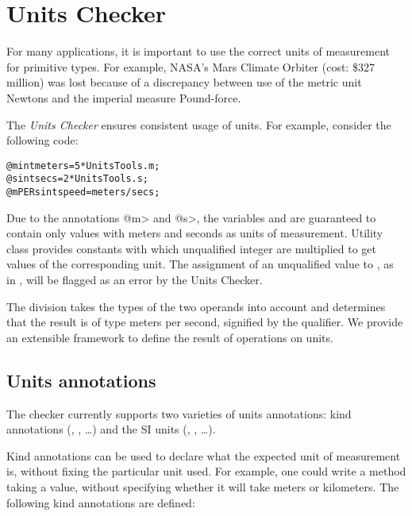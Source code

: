 \htmlhr
\chapter{Units Checker\label{units-checker}}

For many applications, it is important to use the correct units of
measurement for primitive types.  For example, NASA's Mars Climate Orbiter
(cost: \$327 million) was lost because of a discrepancy between use
of the metric unit Newtons and the imperial measure Pound-force.

The \emph{Units Checker} ensures consistent usage of units.
For example, consider the following code:

\begin{alltt}
@m int meters = 5 * UnitsTools.m;
@s int secs = 2 * UnitsTools.s;
@mPERs int speed = meters / secs;
\end{alltt}

Due to the annotations \<@m> and \<@s>, the variables  and  are guaranteed to contain
only values with meters and seconds as units of measurement.
Utility class  provides constants with which
unqualified integer are multiplied to get values of the corresponding unit.
The assignment of an unqualified value to , as in
, will be flagged as an error by the Units Checker.

The division  takes the types of the two operands
into account and determines that the result is of type
meters per second, signified by the  qualifier.
We provide an extensible framework to define the result of operations
on units.


\section{Units annotations\label{units-annotations}}

The checker currently supports two varieties of units annotations:
kind annotations (, , \dots) and
the SI units (, , \dots).


Kind annotations can be used to declare what the expected unit of
measurement is, without fixing the particular unit used.
For example, one could write a method taking a  value,
without specifying whether it will take meters or kilometers.
The following kind annotations are defined:

